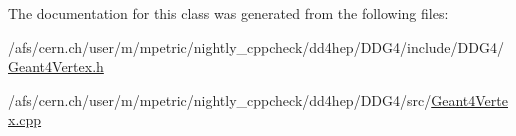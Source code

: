 The documentation for this class was generated from the following files\+:\begin{DoxyCompactItemize}
\item 
/afs/cern.\+ch/user/m/mpetric/nightly\+\_\+cppcheck/dd4hep/\+D\+D\+G4/include/\+D\+D\+G4/\hyperlink{_geant4_vertex_8h}{Geant4\+Vertex.\+h}\item 
/afs/cern.\+ch/user/m/mpetric/nightly\+\_\+cppcheck/dd4hep/\+D\+D\+G4/src/\hyperlink{_geant4_vertex_8cpp}{Geant4\+Vertex.\+cpp}\end{DoxyCompactItemize}
